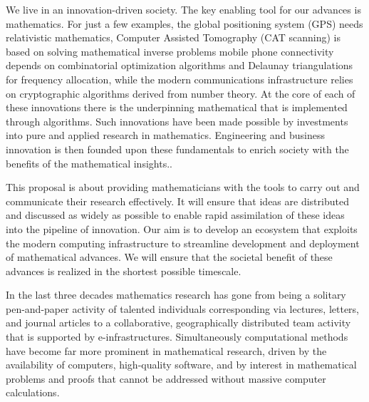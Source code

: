 
We live in an innovation-driven society. The key enabling tool for our
advances is mathematics. For just a few examples, the global
positioning system (GPS) needs relativistic mathematics,
Computer Assisted Tomography (CAT scanning) is based on solving
mathematical inverse problems
mobile phone connectivity depends on combinatorial optimization
algorithms and Delaunay triangulations for frequency allocation,
while the modern
communications infrastructure relies on cryptographic algorithms
derived from number theory. At the core of each of these innovations
there is the underpinning mathematical that is implemented through
algorithms. Such innovations have been made possible by investments
into pure and applied research in mathematics. Engineering and
business innovation is then founded upon these fundamentals to enrich
society with the benefits of the mathematical insights..


This proposal is about providing mathematicians with the tools to
carry out and communicate their research effectively. It will ensure that ideas are
distributed and discussed as widely as possible to enable rapid
assimilation of these ideas into the pipeline of innovation. Our aim
is to develop an ecosystem that exploits the modern computing
infrastructure to streamline development and deployment of
mathematical advances. We will ensure that the societal benefit of
these advances is realized in the shortest possible timescale.

\begin{center}
  \begin{boxedminipage}{.95\textwidth}\em


    In the last three decades mathematics research has gone from being
    a solitary pen-and-paper activity of talented individuals
    corresponding via lectures, letters, and journal articles to a
    collaborative, geographically distributed team activity that is
    supported by e-infrastructures. Simultaneously computational
    methods have become far more prominent in mathematical research,
    driven by the availability of computers, high-quality software,
    and by interest in mathematical problems and proofs that cannot be
    addressed without massive computer calculations. 
\end{boxedminipage}
\end{center}

